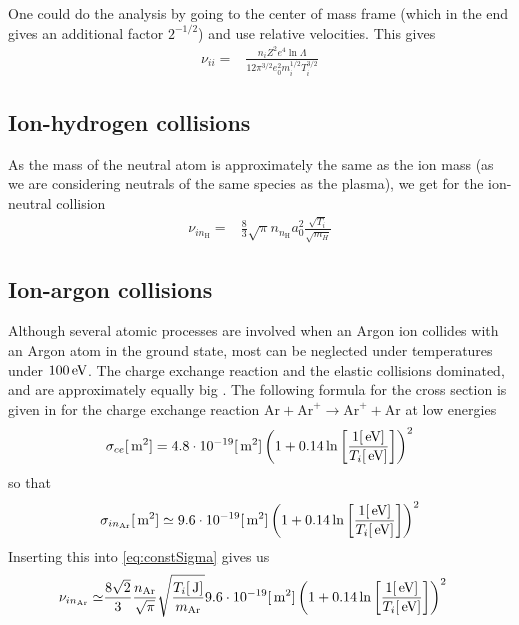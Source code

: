 One could do the analysis by going to the center of mass frame (which in the end gives an additional factor $2^{-1/2}$) and use relative velocities.
This gives
%
\begin{align*}
    \nu_{ii}
    =&
    \frac{n_iZ^2e^4\ln\Lambda}{12\pi^{3/2}e_0^2m_i^{1/2}T_i^{3/2}}
\end{align*}
%

\subsection{Ion-hydrogen collisions}
As the mass of the neutral atom is approximately the same as the ion mass (as we are considering neutrals of the same species as the plasma), we get for the ion-neutral collision
%
\begin{align*}
    \nu_{in_\text{H}}
    =&
    \frac{8}{3} \sqrt{\pi}
    n_{n_\text{H}} a_0^2
    \frac{\sqrt{T_i}}{\sqrt{m_H}}
\end{align*}

\subsection{Ion-argon collisions}
%
Although several atomic processes are involved when an Argon ion collides with an Argon atom in the ground state, most can be neglected under temperatures under $100 \, \text{eV}$.
The charge exchange reaction and the elastic collisions dominated, and are approximately equally big \cite{Lieberman2005}.
The following formula for the cross section is given in \cite{Anders1990} for the charge exchange reaction $\text{Ar}+\text{Ar}^+ \to\text{Ar}^+ +\text{Ar}$ at low energies
%
\begin{align*}
    \sigma_{ce}[\, \text{m}^2] = 4.8\cdot10^{-19}[\, \text{m}^2]\left(1+0.14\ln\left[\frac{1[\, \text{eV}]}{T_i[\, \text{eV}]}\right]\right)^2
\end{align*}
%
so that
%
\begin{align*}
    \sigma_{in_\text{Ar}}[\, \text{m}^2] \simeq 9.6\cdot10^{-19}[\, \text{m}^2]\left(1+0.14\ln\left[\frac{1[\, \text{eV}]}{T_i[\, \text{eV}]}\right]\right)^2
\end{align*}
%
Inserting this into \cref{eq:constSigma} gives us
%
\begin{align*}
    \nu_{in_\text{Ar}}
    \simeq&
    \frac{8\sqrt{2}}{3}
    \frac{n_{\text{Ar}}}{\sqrt{\pi}}
    \sqrt{ \frac{T_i[\, \text{J}]}{m_{\text{Ar}}}}
    9.6\cdot10^{-19}[\, \text{m}^2]\left(1+0.14\ln\left[\frac{1[\, \text{eV}]}{T_i[\, \text{eV}]}\right]\right)^2
\end{align*}

